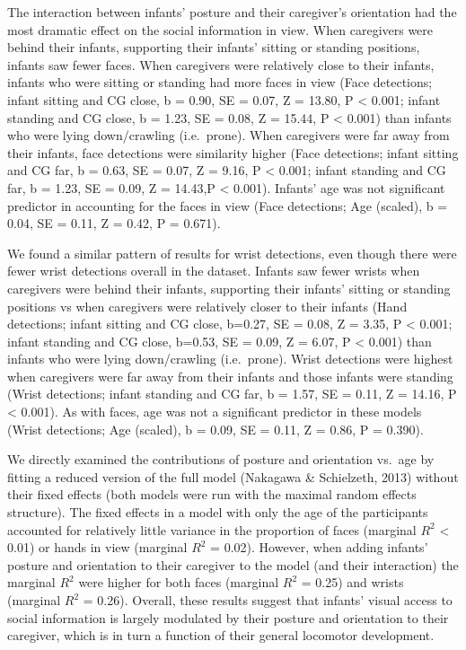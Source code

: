 \documentclass[english,man]{apa6}
\begin{document}
The interaction between infants' posture and their caregiver's
orientation had the most dramatic effect on the social information in
view. When caregivers were behind their infants, supporting their
infants' sitting or standing positions, infants saw fewer faces. When
caregivers were relatively close to their infants, infants who were
sitting or standing had more faces in view (Face detections; infant
sitting and CG close, b = 0.90, SE = 0.07, Z = 13.80, P \textless{}
0.001; infant standing and CG close, b = 1.23, SE = 0.08, Z = 15.44, P
\textless{} 0.001) than infants who were lying down/crawling
(i.e.~prone). When caregivers were far away from their infants, face
detections were similarity higher (Face detections; infant sitting and
CG far, b = 0.63, SE = 0.07, Z = 9.16, P \textless{} 0.001; infant
standing and CG far, b = 1.23, SE = 0.09, Z = 14.43,P \textless{}
0.001). Infants' age was not significant predictor in accounting for the
faces in view (Face detections; Age (scaled), b = 0.04, SE = 0.11, Z =
0.42, P = 0.671).

We found a similar pattern of results for wrist detections, even though
there were fewer wrist detections overall in the dataset. Infants saw
fewer wrists when caregivers were behind their infants, supporting their
infants' sitting or standing positions vs when caregivers were
relatively closer to their infants (Hand detections; infant sitting and
CG close, b=0.27, SE = 0.08, Z = 3.35, P \textless{} 0.001; infant
standing and CG close, b=0.53, SE = 0.09, Z = 6.07, P \textless{} 0.001)
than infants who were lying down/crawling (i.e.~prone). Wrist detections
were highest when caregivers were far away from their infants and those
infants were standing (Wrist detections; infant standing and CG far, b =
1.57, SE = 0.11, Z = 14.16, P \textless{} 0.001). As with faces, age was
not a significant predictor in these models (Wrist detections; Age
(scaled), b = 0.09, SE = 0.11, Z = 0.86, P = 0.390).

We directly examined the contributions of posture and orientation
vs.~age by fitting a reduced version of the full model (Nakagawa \&
Schielzeth, 2013) without their fixed effects (both models were run with
the maximal random effects structure). The fixed effects in a model with
only the age of the participants accounted for relatively little
variance in the proportion of faces (marginal \(R^2\) \textless{} 0.01)
or hands in view (marginal \(R^2\) = 0.02). However, when adding
infants' posture and orientation to their caregiver to the model (and
their interaction) the marginal \(R^2\) were higher for both faces
(marginal \(R^2\) = 0.25) and wrists (marginal \(R^2\) = 0.26). Overall,
these results suggest that infants' visual access to social information
is largely modulated by their posture and orientation to their
caregiver, which is in turn a function of their general locomotor
development.
\end{document}
